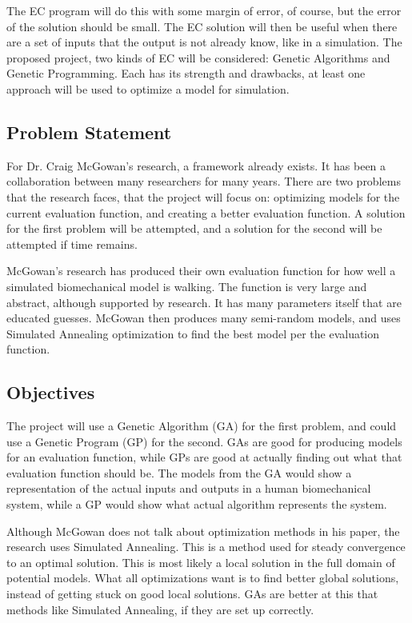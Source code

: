 The EC program will do this with some margin of error, of course, but the 
error of the solution should be small. The EC solution will then be useful 
when there are a set of inputs that the output is not already know, like in 
a simulation. The proposed project, two kinds of EC will be considered: 
Genetic Algorithms and Genetic Programming. Each has its strength and 
drawbacks, at least one approach will be used to optimize a model for 
simulation.

\subsection{Problem Statement}
For Dr. Craig McGowan's research, a framework already exists. It has been a 
collaboration between many researchers for many years. There are two problems
that the research faces, that the project will focus on: optimizing models 
for the current evaluation function, and creating a better evaluation 
function. A solution for the first problem will be attempted, and a solution
for the second will be attempted if time remains. 

McGowan's research has produced their own evaluation function for how 
well a simulated biomechanical model is walking. The function is very large and abstract,
although supported by research. It has many parameters itself that are educated
guesses. McGowan then produces many semi-random models, and uses Simulated 
Annealing optimization to find the best model per the evaluation function. 

\subsection{Objectives}
The project will use a Genetic Algorithm (GA) for the first problem, and 
could use a Genetic Program (GP) for the second. GAs are good for producing
models for an evaluation function, while GPs are good at actually finding
out what that evaluation function should be. The models from the GA would show
a representation of the actual inputs and outputs in a human biomechanical
system, while a GP would show what actual algorithm represents the system.

Although McGowan does not talk about optimization methods in his paper, the
research uses Simulated Annealing. This is a method used for steady convergence
to an optimal solution. This is most likely a local solution in the full domain
of potential models. What all optimizations want is to find better global 
solutions, instead of getting stuck on good local solutions. GAs are better
at this that methods like Simulated Annealing, if they are set up correctly.

